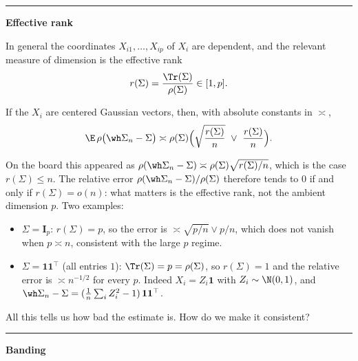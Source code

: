 \begin{center}\rule{0.5\linewidth}{0.5pt}\end{center}

\textbf{Effective rank}

In general the coordinates \(X_{i1}, \dots, X_{ip}\) of \(X_i\) are dependent, and the relevant measure of dimension is the effective rank
\[r(\Sigma) = \frac{\Tr(\Sigma)}{\rho(\Sigma)} \in [1, p].\]

\begin{theorem}[\citet{KL17}]\label{thm:kl}
If the \(X_i\) are centered Gaussian vectors, then, with absolute constants in \(\asymp\),
\[\E\, \rho\big(\wh\Sigma_n - \Sigma\big) \asymp \rho(\Sigma) \Big(\sqrt{\frac{r(\Sigma)}{n}} \ \vee\ \frac{r(\Sigma)}{n}\Big).\]
\end{theorem}

On the board this appeared as \(\rho(\wh\Sigma_n - \Sigma) \asymp \rho(\Sigma) \sqrt{r(\Sigma)/n}\), which is the case \(r(\Sigma) \le n\). The relative error \(\rho(\wh\Sigma_n - \Sigma)/\rho(\Sigma)\) therefore tends to \(0\) if and only if \(r(\Sigma) = o(n)\): what matters is the effective rank, not the ambient dimension \(p\). Two examples:
\begin{itemize}
\item \(\Sigma = \mathbf{I}_p\): \(r(\Sigma) = p\), so the error is \(\asymp \sqrt{p/n} \vee p/n\), which does not vanish when \(p \asymp n\), consistent with the large \(p\) regime.
\item \(\Sigma = \mathbf{1}\mathbf{1}^\top\) (all entries \(1\)): \(\Tr(\Sigma) = p = \rho(\Sigma)\), so \(r(\Sigma) = 1\) and the relative error is \(\asymp n^{-1/2}\) for every \(p\). Indeed \(X_i = Z_i \mathbf{1}\) with \(Z_i \sim \N(0,1)\), and \(\wh\Sigma_n - \Sigma = (\frac{1}{n} \sum_i Z_i^2 - 1)\, \mathbf{1}\mathbf{1}^\top\).
\end{itemize}

All this tells us how bad the estimate is. How do we make it consistent?

\begin{center}\rule{0.5\linewidth}{0.5pt}\end{center}

\textbf{Banding}

